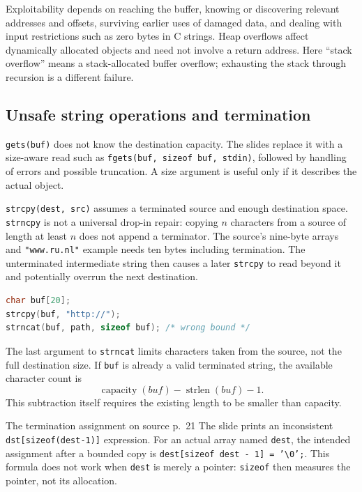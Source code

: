 \documentclass[11pt,a4paper]{article}
\numberwithin{figure}{section}
\begin{document}
Exploitability depends on reaching the buffer, knowing or discovering relevant addresses and offsets, surviving earlier uses of damaged data, and dealing with input restrictions such as zero bytes in C strings. Heap overflows affect dynamically allocated objects and need not involve a return address. Here ``stack overflow'' means a stack-allocated buffer overflow; exhausting the stack through recursion is a different failure.

\subsection{Unsafe string operations and termination}
\texttt{gets(buf)} does not know the destination capacity. The slides replace it with a size-aware read such as \texttt{fgets(buf, sizeof buf, stdin)}, followed by handling of errors and possible truncation. A size argument is useful only if it describes the actual object.

\texttt{strcpy(dest, src)} assumes a terminated source and enough destination space. \texttt{strncpy} is not a universal drop-in repair: copying $n$ characters from a source of length at least $n$ does not append a terminator. The source's nine-byte arrays and \texttt{"www.ru.nl"} example needs ten bytes including termination. The unterminated intermediate string then causes a later \texttt{strcpy} to read beyond it and potentially overrun the next destination.

\begin{lstlisting}[language=C]
char buf[20];
strcpy(buf, "http://");
strncat(buf, path, sizeof buf); /* wrong bound */
\end{lstlisting}
The last argument to \texttt{strncat} limits characters taken from the source, not the full destination size. If \texttt{buf} is already a valid terminated string, the available character count is
\[
\operatorname{capacity}(buf)-\operatorname{strlen}(buf)-1.
\]
This subtraction itself requires the existing length to be smaller than capacity.

\begin{correction}{The termination assignment on source p.~21}
The slide prints an inconsistent \texttt{dst[sizeof(dest-1)]} expression. For an actual array named \texttt{dest}, the intended assignment after a bounded copy is \texttt{dest[sizeof dest - 1] = '\textbackslash{}0';}. This formula does not work when \texttt{dest} is merely a pointer: \texttt{sizeof} then measures the pointer, not its allocation.
\end{correction}
\end{document}
